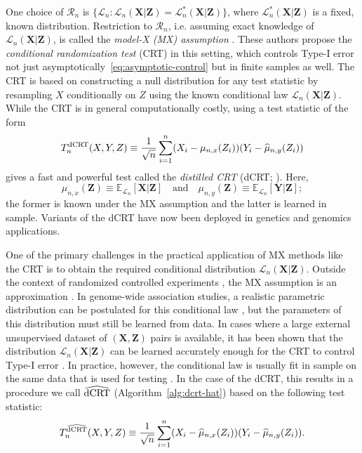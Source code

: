 \documentclass[12pt]{article}
\theoremstyle{definition}
\theoremstyle{remark}
\newcommand{\E}{\mathbb E}								%
\newcommand{\prx}{\bm X}								%
\newcommand{\srx}{X}									%
\newcommand{\prz}{\bm Z}								%
\newcommand{\srz}{Z}									%
\newcommand{\pry}{{\bm Y}}								%
\newcommand{\sry}{Y}									%
\newcommand{\law}{\mathcal L}							%
\newcommand{\regclass}{\mathscr R}					    %
\newcommand{\dCRT}{\textnormal{dCRT}} 					%
\newcommand{\dCRThat}{\widehat{\textnormal{dCRT}}}		%
\begin{document}
	One choice of $\regclass_n$ is $\{\law_n: \law_n(\prx | \prz) = \law_n^*(\prx | \prz)\}$, where $\law_n^*(\prx | \prz)$ is a fixed, known distribution. Restriction to $\regclass_n$, i.e. assuming exact knowledge of $\law_n(\prx | \prz)$, is called the \textit{model-X (MX) assumption} \citep{CetL16}. These authors propose the \textit{conditional randomization test} (CRT) in this setting, which controls Type-I error not just asymptotically~\eqref{eq:asymptotic-control} but in finite samples as well. The CRT is based on constructing a null distribution for any test statistic by resampling $\srx$ conditionally on $\srz$ using the known conditional law $\law_n(\prx|\prz)$. While the CRT is in general computationally costly, using a test statistic of the form
	\begin{equation*}
		T_n^{\dCRT}(\srx, \sry, \srz) \equiv \frac{1}{\sqrt{n}}\sum_{i = 1}^n (\srx_i - \mu_{n,x}(\srz_i))(\sry_i - \widehat \mu_{n,y}(\srz_i))
	\end{equation*}
	gives a fast and powerful test called the \textit{distilled CRT} (dCRT; \cite{Liu2022a}). Here, 
	\begin{equation}
		\mu_{n,x}(\prz) \equiv \E_{\law_n}[\prx|\prz] \quad \text{and} \quad \mu_{n,y}(\prz) \equiv \E_{\law_n}[\pry|\prz];
	\end{equation}
	the former is known under the MX assumption and the latter is learned in sample. Variants of the dCRT have now been deployed in genetics \citep{Bates2020} and genomics \citep{Katsevich2020c} applications.
	
	One of the primary challenges in the practical application of MX methods like the CRT is to obtain the required conditional distribution $\law_n(\prx|\prz)$. Outside the context of randomized controlled experiments \citep{Aufiero2022, Ham2022}, the MX assumption is an approximation \citep{Barber2018, Huang2019, Li2022}. In genome-wide association studies, a realistic parametric distribution can be postulated for this conditional law \citep{SetC17}, but the parameters of this distribution must still be learned from data. In cases where a large external unsupervised dataset of $(\prx, \prz)$ pairs is available, it has been shown that the distribution $\law_n(\prx|\prz)$ can be learned accurately enough for the CRT to control Type-I error \citep{Berrett2019}. In practice, however, the conditional law is usually fit in sample on the same data that is used for testing  \citep{CetL16, SetC17, SetS19, Bates2020, Liu2022a, Li2021b, Sesia2021, Katsevich2020c}. In the case of the dCRT, this results in a procedure we call $\dCRThat$ (Algorithm~\ref{alg:dcrt-hat}) based on the following test statistic:
	\begin{equation}
		T_n^{\dCRThat}(\srx, \sry, \srz) \equiv \frac{1}{\sqrt{n}}\sum_{i = 1}^n (\srx_i - \widehat \mu_{n,x}(\srz_i))(\sry_i - \widehat \mu_{n,y}(\srz_i)).
		\label{eq:dcrt-hat-stat}
	\end{equation}
	
\end{document}
